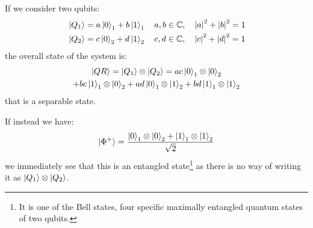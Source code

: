 If we consider two qubits:
\begin{align*}
    &\ket{Q_1} = a \ket{0}_1 + b \ket{1}_1 \quad a, b \in \mathbb{C}, \quad \abs*{a}^2 + \abs*{b}^2 = 1 \\
    &\ket{Q_2} = c\ket{0}_2 + d\ket{1}_2 \quad c,d \in \mathbb{C}, \quad \abs*{c}^2 + \abs*{d}^2 = 1
\end{align*}
the overall state of the system is:
\begin{multline*}
    \ket{QR} = \ket{Q_1} \otimes \ket{Q_2} = ac \ket{0}_1 \otimes \ket{0}_2 \\ +  bc  \ket{1}_1 \otimes \ket{0}_2 + 
    ad \ket{0}_1 \otimes \ket{1}_2 + bd \ket{1}_1 \otimes \ket{1}_2
\end{multline*}
that is a separable state.

If instead we have:
\begin{equation*}
    \ket{\Phi^+} = \frac{\ket{0}_1 \otimes \ket{0}_2 + \ket{1}_1 \otimes \ket{1}_2}{\sqrt{2}}
\end{equation*}
we immediately see that this is an entangled state\footnote{It is one of the Bell states, four specific maximally entangled quantum states of two qubits.} as there is no way of writing it as $\ket{Q_1} \otimes \ket{Q_2}$. 